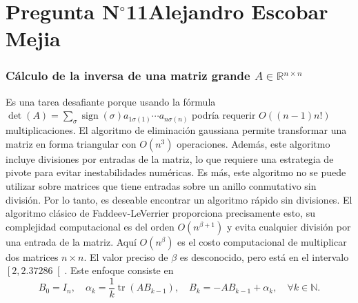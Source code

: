 \section{Pregunta N$^{\circ}$11\qquad Alejandro Escobar Mejia}

\begin{frame}
	\frametitle{
		Cálculo de la inversa de una matriz grande
		$A\in\mathbb{R}^{n\times n}$
	}

	Es una tarea desafiante porque usando la fórmula
	\begin{math}
		\det\left(A\right)=
		\sum_{\sigma}
		\operatorname{sign}\left(\sigma\right)
		a_{1\sigma\left(1\right)}
		\cdots
		a_{n\sigma\left(n\right)}
	\end{math}
	podría requerir $O\left(\left(n-1\right)n!\right)$
	multiplicaciones.
	El algoritmo de eliminación gaussiana permite transformar una
	matriz en forma triangular con $O\left(n^{3}\right)$ operaciones.
	Además, este algoritmo incluye divisiones por entradas de la
	matriz, lo que requiere una estrategia de pivote para evitar
	inestabilidades numéricas.
	Es más, este algoritmo no se puede utilizar sobre matrices que
	tiene entradas sobre un anillo conmutativo sin división.
	Por lo tanto, es deseable encontrar un algoritmo rápido sin
	divisiones.
	El algoritmo clásico de \alert{Faddeev-LeVerrier} proporciona
	precisamente esto, su complejidad computacional es del orden
	$O\left(n^{\beta+1}\right)$ y evita cualquier división por una
	entrada de la matriz.
	Aquí $O\left(n^{\beta}\right)$ es el costo computacional de
	multiplicar dos matrices $n\times n$.
	El valor preciso de $\beta$ es desconocido, pero está en el
	intervalo $\left[2,2.37286\right[$. Este enfoque consiste en
	\begin{equation*}
		B_{0}=I_{n},\quad
		\alpha_{k}=
		\dfrac{1}{k}
		\operatorname{tr}\left(AB_{k-1}\right),\quad
		B_{k}=-AB_{k-1}+\alpha_{k},\quad
		\forall k\in\mathbb{N}.
	\end{equation*}

\end{frame}


